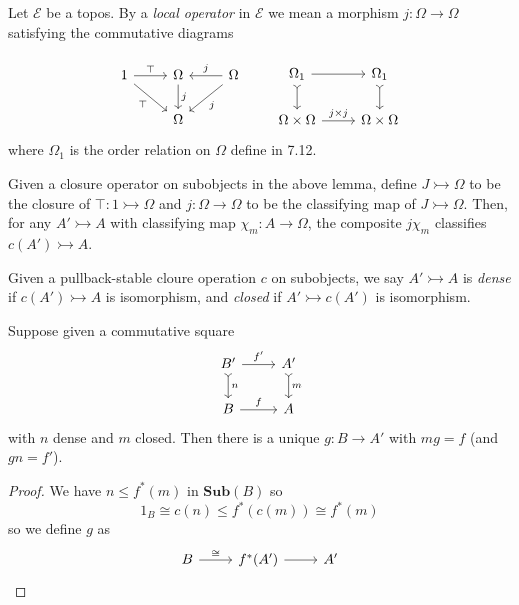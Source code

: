\documentclass[a4paper]{article}
\renewcommand{\c}[1]{\mathbf{#1}}
\newcommand{\Sub}{{\c{Sub}}}
\newcommand{\mono}{\rightarrowtail}
\begin{document}
\begin{definition}
  Let \(\mathcal E\) be a topos. By a \emph{local operator} in \(\mathcal E\) we mean a morphism \(j: \Omega \to \Omega\) satisfying the commutative diagrams
  \[
    \begin{tikzcd}
    \end{tikzcd}
  \]
  \[
    \begin{tikzcd}
      1 \ar[r, "\top"] \ar[dr, "\top"'] & \Omega \ar[d, "j"] & \Omega \ar[l, "j"'] \ar[dl, "j"] \\
      & \Omega
    \end{tikzcd}
    \qquad
    \begin{tikzcd}
      \Omega_1 \ar[r] \ar[d, tail] & \Omega_1 \ar[d, tail] \\
      \Omega \times \Omega \ar[r, "j \times j"] & \Omega \times \Omega
    \end{tikzcd}
  \]
  where \(\Omega_1\) is the order relation on \(\Omega\) define in 7.12.

  Given a closure operator on subobjects in the above lemma, define \(J \mono \Omega\) to be the closure of \(\top: 1 \mono \Omega\) and \(j: \Omega \to \Omega\) to be the classifying map of \(J \mono \Omega\). Then, for any \(A' \mono A\) with classifying map \(\chi_m: A \to \Omega\), the composite \(j \chi_m\) classifies \(c(A') \mono A\).
\end{definition}

Given a pullback-stable cloure operation \(c\) on subobjects, we say \(A' \mono A\) is \emph{dense} if \(c(A') \mono A\) is isomorphism, and \emph{closed} if \(A' \mono c(A')\) is isomorphism.

\begin{lemma}
  \label{lem:factorisation through dense and closed}
  Suppose given a commutative square
  \[
    \begin{tikzcd}
      B' \ar[r, "f'"] \ar[d, "n", tail] & A' \ar[d, "m", tail] \\
      B \ar[r, "f"] & A
    \end{tikzcd}
  \]
  with \(n\) dense and \(m\) closed. Then there is a unique \(g: B \to A'\) with \(mg = f\) (and \(gn = f'\)).
\end{lemma}

\begin{proof}
  We have \(n \leq f^*(m)\) in \(\Sub(B)\) so
  \[
    1_B \cong c(n) \leq f^*(c(m)) \cong f^*(m)
  \]
  so we define \(g\) as
  \[
    \begin{tikzcd}
      B \ar[r, "\cong"] & f^*(A') \ar[r] & A'
    \end{tikzcd}
  \]
\end{proof}
\end{document}
